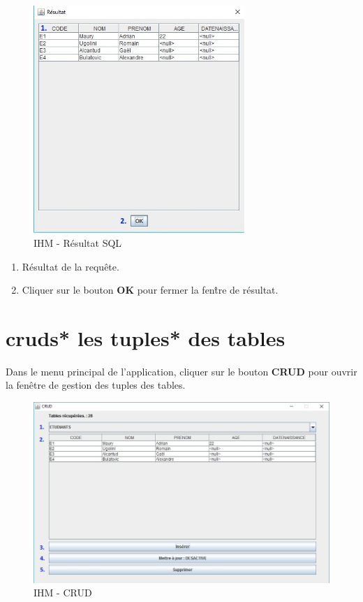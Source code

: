\begin{figure}[!h]
\centering
\includegraphics[width=8cm]{./images/manuel/sql_result.jpg}
\caption{IHM - Résultat SQL}
\label{sql_result}
\end{figure}

\begin{enumerate}
\item Résultat de la requ\^ete.
\item Cliquer sur le bouton \textbf{OK} pour fermer la fen\^tre de résultat.
\end{enumerate}

\section{\glspl{crud}* les \glspl{tuple}* des tables}
Dans le menu principal de l'application, cliquer sur le bouton \textbf{CRUD} pour ouvrir la fen\^etre de gestion des tuples des tables.
\begin{figure}[!h]
\centering
\includegraphics[width=12cm]{./images/manuel/crud.jpg}
\caption{IHM - CRUD}
\label{crud}
\end{figure}

